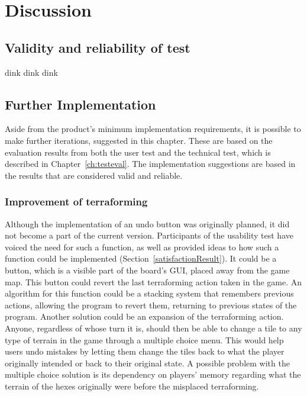 \chapter{Discussion}\label{ch:discussion}

\section{Validity and reliability of test}
dink dink dink

\section{Further Implementation}
Aside from the product's minimum implementation requirements, it is possible to make further iterations, suggested in this chapter. These are based on the evaluation results from both the user test and the technical test, which is described in Chapter~\ref{ch:testeval}. The implementation suggestions are based in the results that are considered valid and reliable.

\subsection{Improvement of terraforming}
Although the implementation of an undo button was originally planned, it did not become a part of the current version. Participants of the usability test have voiced the need for such a function, as well as provided ideas to how such a function could be implemented (Section~\ref{satisfactionResult}). It could be a button, which is a visible part of the board's GUI, placed away from the game map. This button could revert the last terraforming action taken in the game. An algorithm for this function could be a stacking system that remembers previous actions, allowing the program to revert them, returning to previous states of the program. Another solution could be an expansion of the terraforming action. Anyone, regardless of whose turn it is, should then be able to change a tile to any type of terrain in the game through a multiple choice menu. This would help users undo mistakes by letting them change the tiles back to what the player originally intended or back to their original state. A possible problem with the multiple choice solution is its dependency on players' memory regarding what the terrain of the hexes originally were before the misplaced terraforming. 


